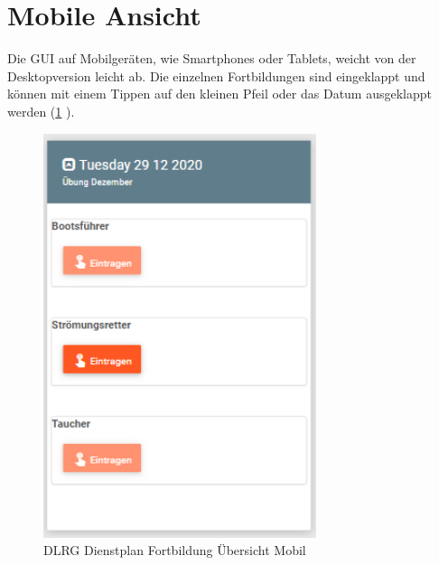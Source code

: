 \section{Mobile Ansicht}
\label{sec:training_mobile}
Die GUI auf Mobilgeräten, wie \zB Smartphones oder Tablets, weicht von der Desktopversion leicht ab. Die einzelnen Fortbildungen sind eingeklappt und können mit einem Tippen auf den kleinen Pfeil oder das Datum ausgeklappt werden (\ref{fig:view_training_mobile_close} \textit{}). 


\begin{figure}[h]
 \begin{addmargin}{-0.2\linewidth}
   \centering 
   \includegraphics[width=8cm]{Bilder/view_training_mobile.png}
 \end{addmargin} 
 \caption[Fortbildungen Übersicht Mobil]{DLRG Dienstplan Fortbildung Übersicht Mobil}
 \label{fig:view_training_mobile_close}
\end{figure}